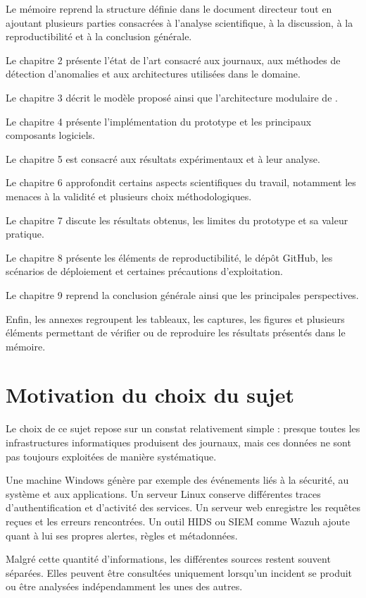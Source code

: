 Le mémoire reprend la structure définie dans le document directeur tout en ajoutant plusieurs parties consacrées à l'analyse scientifique, à la discussion, à la reproductibilité et à la conclusion générale.

Le chapitre 2 présente l'état de l'art consacré aux journaux, aux méthodes de détection d'anomalies et aux architectures utilisées dans le domaine.

Le chapitre 3 décrit le modèle proposé ainsi que l'architecture modulaire de \logminer{}.

Le chapitre 4 présente l'implémentation du prototype et les principaux composants logiciels.

Le chapitre 5 est consacré aux résultats expérimentaux et à leur analyse.

Le chapitre 6 approfondit certains aspects scientifiques du travail, notamment les menaces à la validité et plusieurs choix méthodologiques.

Le chapitre 7 discute les résultats obtenus, les limites du prototype et sa valeur pratique.

Le chapitre 8 présente les éléments de reproductibilité, le dépôt GitHub, les scénarios de déploiement et certaines précautions d'exploitation.

Le chapitre 9 reprend la conclusion générale ainsi que les principales perspectives.

Enfin, les annexes regroupent les tableaux, les captures, les figures et plusieurs éléments permettant de vérifier ou de reproduire les résultats présentés dans le mémoire.

\section{Motivation du choix du sujet}

Le choix de ce sujet repose sur un constat relativement simple : presque toutes les infrastructures informatiques produisent des journaux, mais ces données ne sont pas toujours exploitées de manière systématique.

Une machine Windows génère par exemple des événements liés à la sécurité, au système et aux applications. Un serveur Linux conserve différentes traces d'authentification et d'activité des services. Un serveur web enregistre les requêtes reçues et les erreurs rencontrées. Un outil HIDS ou SIEM comme Wazuh ajoute quant à lui ses propres alertes, règles et métadonnées.

Malgré cette quantité d'informations, les différentes sources restent souvent séparées. Elles peuvent être consultées uniquement lorsqu'un incident se produit ou être analysées indépendamment les unes des autres.

